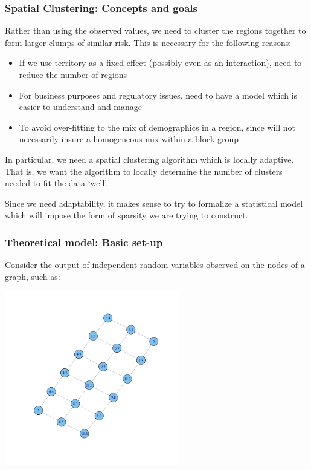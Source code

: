 \begin{frame}
  \frametitle{Spatial Clustering: Concepts and goals}
  \footnotesize

  Rather than using the observed values, we need to cluster the regions
  together to form larger clumps of similar risk. This is necessary for the following
  reasons:
  \begin{itemize}
  \item If we use territory as a fixed effect (possibly even as an interaction),
  need to reduce the number of regions\pause
  \item For business purposes and regulatory issues, need to have a model which
  is easier to understand and manage\pause
  \item To avoid over-fitting to the mix of demographics in a region, since will not
  necessarily insure a homogeneous mix within a block group\pause
  \end{itemize}
  In particular, we need a spatial clustering algorithm which is locally adaptive. That
  is, we want the algorithm to locally determine the number of clusters needed to fit
  the data `well'.

  \medskip

  Since we need adaptability, it makes sense to try to formalize a statistical
  model which will impose the form of sparsity we are trying to construct.


\end{frame}

\begin{frame}
  \frametitle{Theoretical model: Basic set-up}
  \small

  Consider the output of independent random variables observed on the nodes of a graph,
    such as:
  \vspace{-0.3in}

  \begin{center}
  \includegraphics[height=3in]{img/graph_plain}
  \end{center}

\end{frame}


